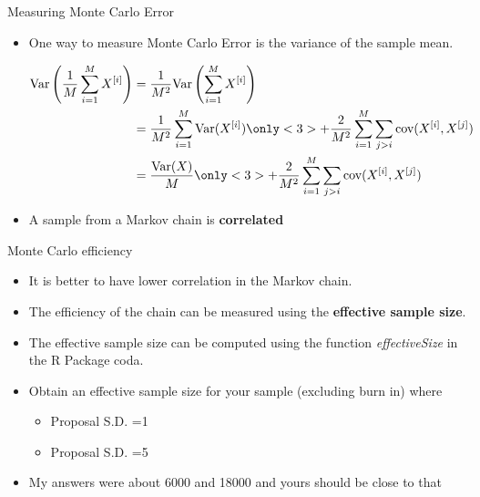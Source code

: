 \documentclass[10pt]{beamer}
\begin{document}
\begin{frame}{Measuring Monte Carlo Error}
\begin{itemize}
\item One way to measure Monte Carlo Error is the variance of the sample mean.

\begin{align*}
\mbox{Var}\left(\frac{1}{M}\sum_{i=1}^M X^{[i]}\right)&=\frac{1}{M^2} \mbox{Var}\left(\sum_{i=1}^M X^{[i]}\right)\\
&=\frac{1}{M^2} \sum_{i=1}^M\mbox{Var}(X^{[i]})
\only<3>{+\frac{2}{M^2}\sum_{i=1}^M\sum_{j>i}\mbox{cov}(X^{[i]},X^{[j]})}\\
&=\frac{\mbox{Var}(X)}{M}
\only<3>{+\frac{2}{M^2}\sum_{i=1}^M\sum_{j>i}\mbox{cov}(X^{[i]},X^{[j]})}\\
\end{align*}

\item A sample from a Markov chain is {\bf correlated}
\end{itemize}
\end{frame}
\begin{frame}{Monte Carlo efficiency}
\begin{itemize}
\item It is better to have lower correlation in the Markov chain.

\item The efficiency of the chain can be measured using the {\bf effective sample size}.

\item The effective sample size can be computed using the function {\em effectiveSize} in the R Package coda.

\item Obtain an effective sample size for your sample (excluding burn in) where

\begin{itemize}
\item Proposal S.D. =1
\item Proposal S.D. =5
\end{itemize}

\item My answers were about 6000 and 18000 and yours should be close to that
\end{itemize}
\end{frame}
\end{document}
